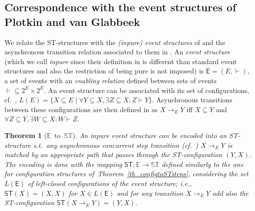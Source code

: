 \documentclass[submission,copyright,creativecommons]{eptcs}
\newtheorem{theorem}{Theorem}[section]
\newcommand\E{\ensuremath{\mathsf{E}}}
\newcommand\ST{\ensuremath{\mathsf{ST}}}
\newcommand\allST{\ensuremath{\mathbb{ST}}}
\newcommand\allEv{\ensuremath{\mathbb{E}}}
\newcommand\stepTransEvGlabbeek{\ensuremath{\rightarrow_{E}}}
\newcommand\enableRelEv{\ensuremath{\vdash}}
\newcommand\stEnc{\ensuremath{\ST}}
\begin{document}
\subsection{Correspondence with the event structures of Plotkin and van Glabbeek}

We relate the ST-structures with the \textit{(inpure) event structures} of \cite[Def.1.3]{GlabbeekP09configStruct} and the asynchronous transition relation associated to them in \cite[Def.2.3]{GlabbeekP09configStruct}.
An \textit{event structure} (which we call \textit{inpure} since their definition in \cite[Def.1.3]{GlabbeekP09configStruct} is different than standard event structures and also the restriction of being pure is not imposed) is $\E=(E,\enableRelEv)$, a set of events with an \textit{enabling relation} defined between sets of events $\enableRelEv\subseteq 2^{E}\times 2^{E}$. An event structure can be associated with its set of configurations, cf.\ \cite[Def.1.4]{GlabbeekP09configStruct}, $L(E)=\{X\subseteq E \mid \forall Y\subseteq X,\exists Z\subseteq X:Z\enableRelEv Y\}$. Asynchronous transitions between these configurations are then defined in \cite[Def.2.3]{GlabbeekP09configStruct} as $X\stepTransEvGlabbeek Y$ iff $X\subseteq Y$ and $\forall Z\subseteq Y,\exists W\subseteq X: W\enableRelEv Z$.

\begin{theorem}[\allEv\ to\ \allST]\label{th_inpureEv_to_ST}
An inpure event structure can be encoded into an ST-structure s.t.\ any asynchronous concurrent step transition (cf.\ \cite[Def.2.3]{GlabbeekP09configStruct}) $X\stepTransEvGlabbeek Y$ is matched by an appropriate path that passes through the ST-configu\-ration $(Y,X)$.
The encoding is done with the mapping $\stEnc:\allEv\rightarrow\allST$ defined similarly to the one for configuration structures of~Theorem~\ref{th_configtoSTsteps}, considering the set $L(\E)$ of left-closed configurations \cite[Def.1.4]{GlabbeekP09configStruct} of the event structure; i.e., $\stEnc(X)=(X,X)$ for $X\in L(\E)$ and for any transition $X\stepTransEvGlabbeek Y$ add also the ST-configuration $\stEnc(X\stepTransEvGlabbeek Y)=(Y,X)$.
\end{theorem}
\end{document}
